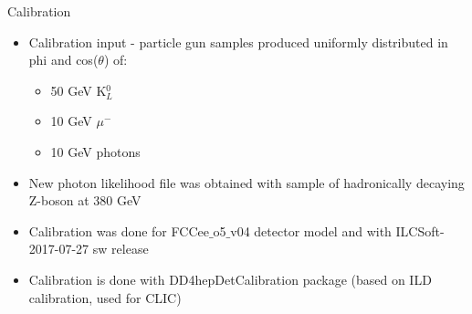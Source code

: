 \documentclass[8pt]{beamer}
\begin{document}
\begin{frame}{\large \large Calibration}
 
 \begin{itemize}
  \item Calibration input - particle gun samples produced uniformly distributed in phi and cos($\theta$) of:
  \begin{itemize}
   \item 50 GeV K$^0_L$
   \item 10 GeV $\mu^-$
   \item 10 GeV photons \\ \vspace{0.3cm}
  \end{itemize}
  \item New photon likelihood file was obtained with sample of hadronically decaying Z-boson at 380 GeV\\ \vspace{0.3cm}
  \item Calibration was done for FCCee$\_$o5$\_$v04 detector model and with ILCSoft-2017-07-27 sw release\\ \vspace{0.3cm}
  \item Calibration is done with DD4hepDetCalibration package (based on ILD calibration, used for CLIC)\\ \vspace{0.3cm}
 \end{itemize}

 
\end{frame}
\end{document}

